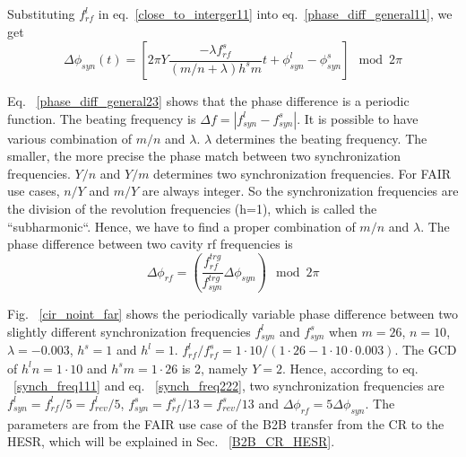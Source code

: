 Substituting $f_{\mathit{rf}}^{l}$ in eq.~\ref{close_to_interger11} into eq.~\ref{phase_diff_general11}, we get 
\begin{equation}
	\Delta \phi_\mathit{syn}(t)=[2\pi Y\frac{-\lambda f_{\mathit{rf}}^{s}}{(m/n+\lambda)h^{s}m}t+\phi_\mathit{syn}^l-\phi^s_\mathit{syn}] \mod 2\pi \label{phase_diff_general23}
\end{equation}

Eq. ~\ref{phase_diff_general23} shows that the phase difference is a periodic function. The beating frequency is $\Delta f=|f_{\mathit{syn}}^{l}-f_{\mathit{syn}}^{s}|$. It is possible to have various combination of $m/n$ and $\lambda$. $\lambda$ determines the beating frequency. The smaller, the more precise the phase match between two synchronization frequencies. $Y/n$ and $Y/m$ determines two synchronization frequencies. For FAIR use cases, $n/Y$ and $m/Y$ are always integer. So the synchronization frequencies are the division of the revolution frequencies (h=1), which is called the ``subharmonic``. Hence, we have to find a proper combination of $m/n$ and $\lambda$.  The phase difference between two cavity rf frequencies is
\begin{equation}
\Delta \phi_\mathit{rf}=(\frac{f_{\mathit{rf}}^{trg}}{f_{\mathit{syn}}^{trg}}\Delta \phi_\mathit{syn}) \mod 2\pi 
\end{equation}

Fig. ~\ref{cir_noint_far} shows the periodically variable phase difference between two slightly different synchronization frequencies $f_{\mathit{syn}}^{l}$ and $f_{\mathit{syn}}^{s}$ when $m=26$, $n=10$, $\lambda=-0.003$, $h^s=1$ and $h^l=1$. $f_{\mathit{rf}}^{l}/f_{\mathit{rf}}^{s}=1\cdot 10/(1\cdot26-1\cdot10\cdot0.003)$. The GCD of $h^ln=1\cdot10$ and $h^s m=1\cdot26$ is 2, namely $Y=2$. Hence, according to eq. ~\ref{synch_freq111} and eq. ~\ref{synch_freq222}, two synchronization frequencies are $f_{\mathit{syn}}^{l}=f_{\mathit{rf}}^{l}/5=f_{\mathit{rev}}^{l}/5$, $f_{\mathit{syn}}^{s}=f_{\mathit{rf}}^{s}/13=f_{\mathit{rev}}^{s}/13$ and $\Delta \phi_\mathit{rf}=5\Delta \phi_\mathit{syn}$. The parameters are from the FAIR use case of the B2B transfer from the CR to the HESR, which will be explained in Sec. ~\ref{B2B_CR_HESR}. 

